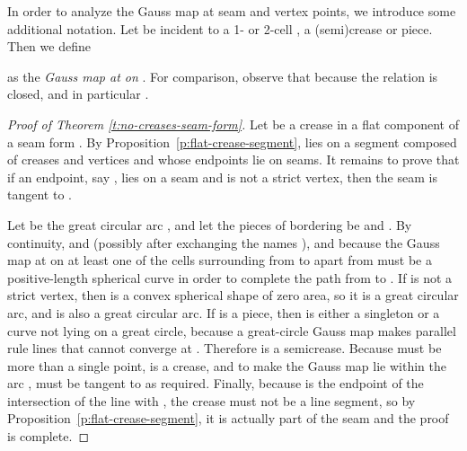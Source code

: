\documentclass{article}
\newcommand\term[1]{{\it #1}}
\begin{document}
In order to analyze the Gauss map at seam and vertex points, we
introduce some additional notation.  Let  be incident to a
1- or 2-cell , a (semi)crease or piece.  Then we define

as the \term{Gauss map at  on }.  For comparison,
observe that  because the relation
 is closed, and in particular .

\begin{proof}[Proof of Theorem \ref{t:no-creases-seam-form}]
  Let  be a crease in a flat component of a seam form .  By
  Proposition~\ref{p:flat-crease-segment},  lies on a segment
   composed of creases and vertices and whose endpoints lie on seams.  It remains
  to prove that if an endpoint, say , lies on a seam and is not a
  strict vertex, then the seam is tangent to .

  Let  be the great circular arc , and let the pieces of 
  bordering  be  and .  By continuity,
   and  (possibly after exchanging the names
  ), and because  the Gauss map at  on at least one
  of the cells  surrounding  from  to  apart from
   must be a positive-length spherical curve in order to
  complete the path from  to .
  If  is not a strict vertex, then  is a convex spherical
  shape of zero area, so it is a great circular arc,
  and  is also a great circular arc.
  If  is a piece, then  is either a singleton or a
  curve not lying on a great circle, because a great-circle Gauss map
  makes parallel rule lines that cannot converge at .
  Therefore  is a semicrease.  Because  must be more than a single
  point,  is a crease, and to make the Gauss map lie within
  the arc ,  must be tangent to  as required.  Finally,
  because  is the endpoint of the intersection of the line 
  with , the crease  must not be a line segment, so by
  Proposition~\ref{p:flat-crease-segment},
  it is actually part of the seam and the proof is complete.
\end{proof}
\end{document}
